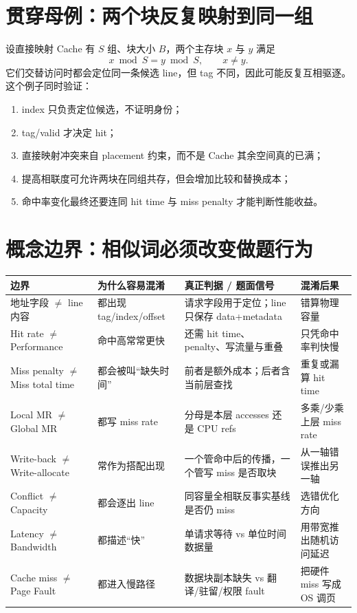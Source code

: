 \documentclass[UTF8,fontset=fandol,11pt,a4paper]{ctexart}
\begin{document}
\section{贯穿母例：两个块反复映射到同一组}
设直接映射 Cache 有 $S$ 组、块大小 $B$，两个主存块 $x$ 与 $y$ 满足
\[
x\bmod S=y\bmod S,\qquad x\neq y.
\]
它们交替访问时都会定位同一条候选 line，但 tag 不同，因此可能反复互相驱逐。这个例子同时验证：
\begin{enumerate}
\item index 只负责定位候选，不证明身份；
\item tag/valid 才决定 hit；
\item 直接映射冲突来自 placement 约束，而不是 Cache 其余空间真的已满；
\item 提高相联度可允许两块在同组共存，但会增加比较和替换成本；
\item 命中率变化最终还要连同 hit time 与 miss penalty 才能判断性能收益。
\end{enumerate}

\section{概念边界：相似词必须改变做题行为}
\begin{center}\small
\begin{tabularx}{\linewidth}{L{2.2cm}L{2.8cm}YY}
\toprule
边界 & 为什么容易混淆 & 真正判据 / 题面信号 & 混淆后果\\\midrule
地址字段 $\neq$ line 内容 & 都出现 tag/index/offset & 请求字段用于定位；line 只保存 data+metadata & 错算物理容量\\
Hit rate $\neq$ Performance & 命中高常常更快 & 还需 hit time、penalty、写流量与重叠 & 只凭命中率判快慢\\
Miss penalty $\neq$ Miss total time & 都会被叫“缺失时间” & 前者是额外成本；后者含当前层查找 & 重复或漏算 hit time\\
Local MR $\neq$ Global MR & 都写 miss rate & 分母是本层 accesses 还是 CPU refs & 多乘/少乘上层 miss rate\\
Write-back $\neq$ Write-allocate & 常作为搭配出现 & 一个管命中后的传播，一个管写 miss 是否取块 & 从一轴错误推出另一轴\\
Conflict $\neq$ Capacity & 都会逐出 line & 同容量全相联反事实基线是否仍 miss & 选错优化方向\\
Latency $\neq$ Bandwidth & 都描述“快” & 单请求等待 vs 单位时间数据量 & 用带宽推出随机访问延迟\\
Cache miss $\neq$ Page Fault & 都进入慢路径 & 数据块副本缺失 vs 翻译/驻留/权限 fault & 把硬件 miss 写成 OS 调页\\
\bottomrule
\end{tabularx}
\end{center}
\end{document}
